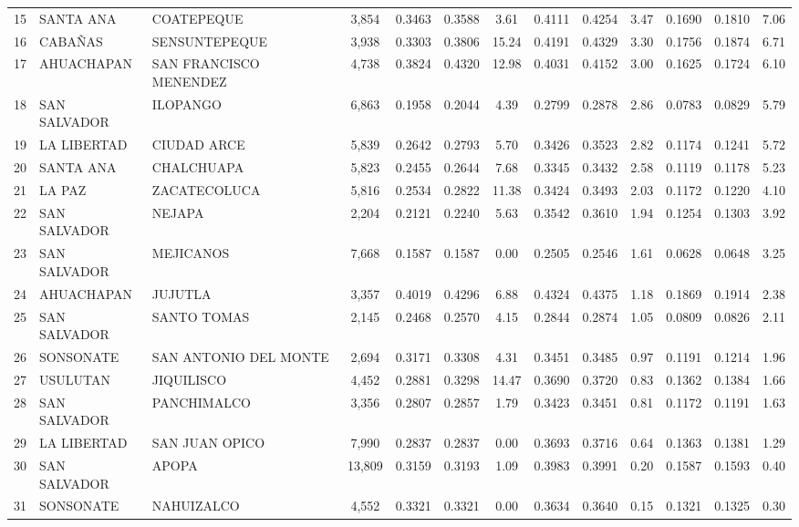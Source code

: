 \begin{table}[H]
{\begin{tabular}{lllcccccccccc}
15	&	SANTA ANA	&	COATEPEQUE	&	3,854	&	0.3463	&	0.3588	&	3.61	&	0.4111	&	0.4254	&	3.47	&	0.1690	&	0.1810	&	7.06	\\ 
16	&	CABAÑAS	&	SENSUNTEPEQUE	&	3,938	&	0.3303	&	0.3806	&	15.24	&	0.4191	&	0.4329	&	3.30	&	0.1756	&	0.1874	&	6.71	\\ 
17	&	AHUACHAPAN	&	SAN FRANCISCO MENENDEZ	&	4,738	&	0.3824	&	0.4320	&	12.98	&	0.4031	&	0.4152	&	3.00	&	0.1625	&	0.1724	&	6.10	\\ 
18	&	SAN SALVADOR	&	ILOPANGO	&	6,863	&	0.1958	&	0.2044	&	4.39	&	0.2799	&	0.2878	&	2.86	&	0.0783	&	0.0829	&	5.79	\\ 
19	&	LA LIBERTAD	&	CIUDAD ARCE	&	5,839	&	0.2642	&	0.2793	&	5.70	&	0.3426	&	0.3523	&	2.82	&	0.1174	&	0.1241	&	5.72	\\ 
20	&	SANTA ANA	&	CHALCHUAPA	&	5,823	&	0.2455	&	0.2644	&	7.68	&	0.3345	&	0.3432	&	2.58	&	0.1119	&	0.1178	&	5.23	\\ 
21	&	LA PAZ	&	ZACATECOLUCA	&	5,816	&	0.2534	&	0.2822	&	11.38	&	0.3424	&	0.3493	&	2.03	&	0.1172	&	0.1220	&	4.10	\\ 
22	&	SAN SALVADOR	&	NEJAPA	&	2,204	&	0.2121	&	0.2240	&	5.63	&	0.3542	&	0.3610	&	1.94	&	0.1254	&	0.1303	&	3.92	\\ 
23	&	SAN SALVADOR	&	MEJICANOS	&	7,668	&	0.1587	&	0.1587	&	0.00	&	0.2505	&	0.2546	&	1.61	&	0.0628	&	0.0648	&	3.25	\\ 
24	&	AHUACHAPAN	&	JUJUTLA	&	3,357	&	0.4019	&	0.4296	&	6.88	&	0.4324	&	0.4375	&	1.18	&	0.1869	&	0.1914	&	2.38	\\ 
25	&	SAN SALVADOR	&	SANTO TOMAS	&	2,145	&	0.2468	&	0.2570	&	4.15	&	0.2844	&	0.2874	&	1.05	&	0.0809	&	0.0826	&	2.11	\\ 
26	&	SONSONATE	&	SAN ANTONIO DEL MONTE	&	2,694	&	0.3171	&	0.3308	&	4.31	&	0.3451	&	0.3485	&	0.97	&	0.1191	&	0.1214	&	1.96	\\ 
27	&	USULUTAN	&	JIQUILISCO	&	4,452	&	0.2881	&	0.3298	&	14.47	&	0.3690	&	0.3720	&	0.83	&	0.1362	&	0.1384	&	1.66	\\ 
28	&	SAN SALVADOR	&	PANCHIMALCO	&	3,356	&	0.2807	&	0.2857	&	1.79	&	0.3423	&	0.3451	&	0.81	&	0.1172	&	0.1191	&	1.63	\\ 
29	&	LA LIBERTAD	&	SAN JUAN OPICO	&	7,990	&	0.2837	&	0.2837	&	0.00	&	0.3693	&	0.3716	&	0.64	&	0.1363	&	0.1381	&	1.29	\\ 
30	&	SAN SALVADOR	&	APOPA	&	13,809	&	0.3159	&	0.3193	&	1.09	&	0.3983	&	0.3991	&	0.20	&	0.1587	&	0.1593	&	0.40	\\ 
31	&	SONSONATE	&	NAHUIZALCO	&	4,552	&	0.3321	&	0.3321	&	0.00	&	0.3634	&	0.3640	&	0.15	&	0.1321	&	0.1325	&	0.30	\\ 

\end{tabular}}
\end{table}
